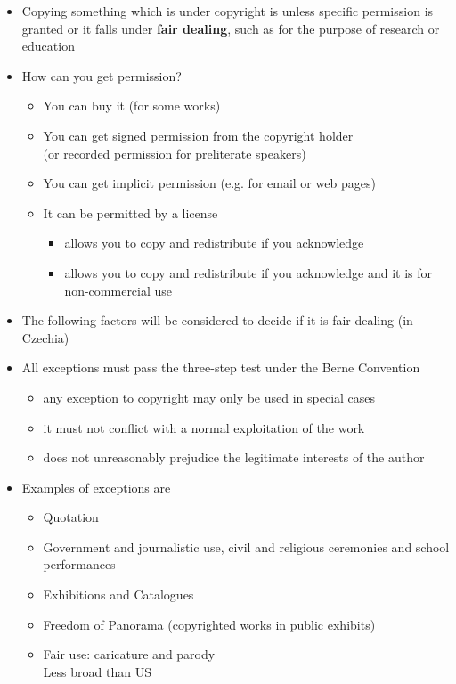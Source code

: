 \documentclass[a4paper,landscape,headrule,footrule,xetex]{foils}
\begin{document}
\begin{center}
\end{center}


\begin{itemize}
\item Copying something which is under copyright is  unless
  specific permission is granted or it falls under \textbf{fair
    dealing}, such as for the purpose of research or education
\item How can you get permission?
  \begin{itemize}
  \item You can buy it (for some works)
  \item You can get signed permission from the copyright holder
\\ (or recorded permission for preliterate speakers)
  \item You can get implicit permission (e.g. for email or web pages)
  \item It can be permitted by a license
    \begin{itemize}
    \item {} allows you to copy and redistribute if you acknowledge
    \item {} allows you to copy and redistribute if you
      acknowledge and it is for non-commercial use
    \end{itemize}
  \end{itemize}

\newpage {}
\item The following factors will be considered to decide if it is fair
  dealing (in Czechia)
\item All exceptions must pass the 
    three-step test under the Berne Convention
  \begin{itemize}
  \item  any exception to copyright may only be used in special cases
  \item it must not conflict with a normal exploitation of the work 
  \item does not unreasonably prejudice the legitimate interests of the author
  \end{itemize}
\item Examples of exceptions are
  \begin{itemize}
  \item Quotation
  \item Government and journalistic use, civil and religious ceremonies and school performances 
  \item Exhibitions and Catalogues
  \item Freedom of Panorama (copyrighted works in public exhibits)
  \item Fair use:  caricature and parody
    \\ Less broad than US
  \end{itemize} 
\end{itemize}
\end{document}
